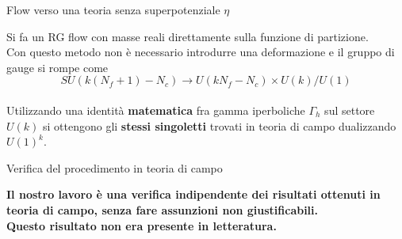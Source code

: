 \documentclass[10pt,compress,usenames,dvipsnames]{beamer}
\begin{document}
\begin{frame}{Flow verso una teoria senza superpotenziale $\eta$}

Si fa un RG flow con masse reali direttamente sulla funzione di partizione.
\\
Con questo metodo non è necessario introdurre una deformazione 
e il gruppo di gauge si rompe come 
\vspace{0.2cm}
$$
 SU(k (N_f + 1) - N_c ) \longrightarrow U(k N_f - N_c ) \times U(k) / U(1)
$$
\\
\vspace{0.3cm}
Utilizzando una identità \alert{\bfseries matematica} fra gamma iperboliche $\Gamma_h$ sul settore $U(k)$ si ottengono gli \alert{\bfseries stessi singoletti} trovati in teoria di campo dualizzando $U(1)^k$.
\end{frame}


\begin{frame}{Verifica del procedimento in teoria di campo}
\begin{center}
{\large \bfseries  
Il nostro lavoro è una \alert{\bfseries verifica indipendente} dei risultati ottenuti in teoria di campo, senza fare \alert{\bfseries assunzioni} non giustificabili.
\\[0.3cm]
{\alert{\bfseries Questo risultato non era presente in letteratura}.
}
} 
\\
\vspace{0.5cm}
\\
\end{center}



\end{frame}



\nocite{*}

{ \footnotesize 

}
\end{document}
